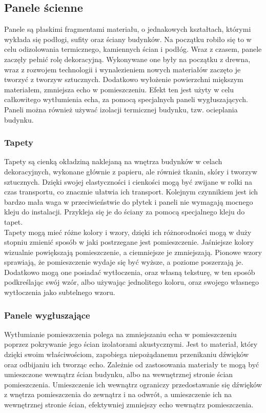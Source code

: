 \documentclass{article} %
\begin{document}
        
    \subsection{Panele ścienne}
        Panele są płaskimi fragmentami materiału, o jednakowych kształtach, którymi wykłada się podłogi, sufity oraz ściany budynków. Na początku robiło się to w celu odizolowania termicznego, kamiennych ścian i podłóg. Wraz z czasem, panele zaczęły pełnić rolę dekoracyjną. Wykonywane one były na początku z drewna, wraz z rozwojem technologii i wynalezieniem nowych materiałów zaczęto je tworzyć z tworzyw sztucznych. Dodatkowo wyłożenie powierzchni miększym materiałem, zmniejsza echo w pomieszczeniu. Efekt ten jest użyty w celu całkowitego wytłumienia echa, za pomocą specjalnych paneli wygłuszających. Paneli można również używać izolacji termicznej budynku, tzw. ocieplania budynku. 
        \\
        
        \subsubsection{Tapety}
        Tapety są cienką okładziną naklejaną na wnętrza budynków w celach dekoracyjnych, wykonane głównie z papieru, ale również tkanin, skóry i tworzyw sztucznych. Dzięki swojej elastyczności i cienkości mogą być zwijane w rolki na czas transportu, co znacznie ułatwia ich transport. Kolejnym czynnikiem jest ich bardzo mała waga w przeciwieństwie do płytek i paneli nie wymagają mocnego kleju do instalacji. Przykleja się je do ściany za pomocą specjalnego kleju do tapet. 
        \\
        
        Tapety mogą mieć różne kolory i wzory, dzięki ich różnorodności mogą w duży stopniu zmienić sposób w jaki postrzegane jest pomieszczenie. Jaśniejsze kolory wizualnie powiększają pomieszczenie, a ciemniejsze je zmniejszają. Pionowe wzory sprawiają, że pomieszczenie wydaje się być wyższe, a poziome poszerzają je. Dodatkowo mogą one posiadać wytłoczenia, oraz własną teksturę, w ten sposób podkreślając swój wzór, albo używając jednolitego koloru, oraz swojego własnego wytłoczenia jako subtelnego wzoru. 
        \\
        
        \subsubsection{Panele wygłuszające}
        Wytłumianie pomieszczenia polega na zmniejszaniu echa w pomieszczeniu poprzez pokrywanie jego ścian izolatorami akustycznymi. Jest to materiał, który dzięki swoim właściwościom, zapobiega niepożądanemu przenikaniu dźwięków oraz odbijaniu ich tworząc echo. Zależnie od zastosowania materiały te mogą być umieszczone wewnątrz ścian budynku, albo na wewnętrznej stronie ścian pomieszczenia. Umieszczenie ich wewnątrz ograniczy przedostawanie się dźwięków z wnętrza pomieszczenia do zewnątrz i na odwrót, a umieszczenie ich na wewnętrznej stronie ścian, efektywniej zmniejszy echo wewnątrz pomieszczenia.
        \\
        
\end{document}
